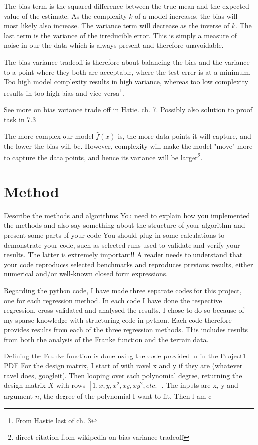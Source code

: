 \documentclass[12pt]{article}
\begin{document}
\begin{multicols}{2}
The bias term is the squared difference between the true mean and the expected value of the estimate. As the complexity $k$ of a model increases, the bias will most likely also increase. The variance term will decrease as the inverse of $k$. The last term is the variance of the irreducible error. This is simply a measure of noise in our the data which is always present and therefore unavoidable.  

The bias-variance tradeoff is therefore about balancing the bias and the variance to a point where they both are acceptable, where the test error is at a minimum. Too high model complexity results in high variance, whereas too low complexity results in too high bias and vice versa\footnote{From Hastie last of ch. 3}.

See more on bias variance trade off in Hatie. ch. 7. 
Possibly also solution to proof task in 7.3

The more complex our model $\hat{f}(x)$ is, the more data points it will capture, and the lower the bias will be. However, complexity will make the model "move" more to capture the data points, and hence its variance will be larger\footnote{direct citation from wikipedia on bias-variance tradeoff}.


\section{Method}
Describe the methods and algorithms
You need to explain how you implemented the methods and also say something about the structure of your algorithm and present some parts of your code
You should plug in some calculations to demonstrate your code, such as selected runs used to validate and verify your results. The latter is extremely important!! A reader needs to understand that your code reproduces selected benchmarks and reproduces previous results, either numerical and/or well-known closed form expressions.

Regarding the python code, I have made three separate codes for this project, one for each regression method. In each code I have done the respective regression, cross-validated and analysed the results. I chose to do so because of my sparse knowledge with structuring code in python. Each code therefore provides results from each of the three regression methods. This includes results from both the analysis of the Franke function and the terrain data.   

Defining the Franke function is done using the code provided in in the Project1 PDF %
For the design matrix, I start of with ravel x and y if they are (whatever ravel does, googleit). Then looping over each polynomial degree, returning the design matrix $X$ with rows $[1, x, y, x^2, xy, xy^2, etc.]$. The inputs are x, y and argument $n$, the degree of the polynomial I want to fit. Then I am c 


\end{multicols}
\end{document}
